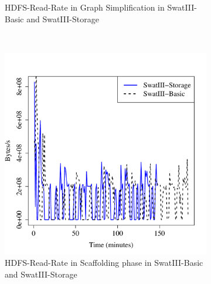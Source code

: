 \documentclass[conference]{IEEEtran}
\begin{document}
\begin{figure}[htb]
\begin{subfigure}[b]{0.3\textwidth}
                \caption{HDFS-Read-Rate in Graph Simplification in SwatIII-Basic and SwatIII-Storage}
                \label{fig:ECHddSsdHdfsRdIops}
        \end{subfigure}
        ~ %
        \begin{subfigure}[b]{0.3\textwidth}
                \includegraphics[width=\textwidth]{Figure/SystemData/Plots/SCFHddSsdHdfsRdIops.pdf}
                \caption{HDFS-Read-Rate in Scaffolding phase in SwatIII-Basic and SwatIII-Storage}
                \label{fig:SCFHddSsdHdfsRdIops}
        \end{subfigure}        
        \begin{subfigure}[b]{0.3\textwidth}

\end{subfigure}
\end{figure}
\end{document}
